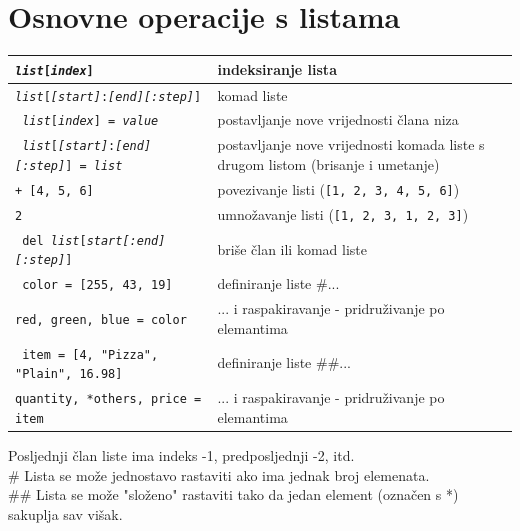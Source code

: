 \documentclass[10pt]{article}
\begin{document}
    \section*{\color{NavyBlue} Osnovne operacije s listama}
    \begin{tabular}{|>{\tt}p{9.00cm}|>{}p{15.50cm}|}
        \hline
        \textit{list}[\textit{index}] & indeksiranje lista 
        \\ \hline
        \textit{list}[\textit{[start]}:\textit{[end]}\textit{[:step]}] & komad liste 
        \\ \hline
        \textit{list}[\textit{index}] = \textit{value} & postavljanje nove vrijednosti člana niza
        \\ \hline
        \textit{list}[\textit{[start]}:\textit{[end]}\textit{[:step]}] = \textit{list} & postavljanje nove vrijednosti komada liste s drugom listom (brisanje i umetanje)
        \\ \hline
        [1, 2, 3] + [4, 5, 6] & povezivanje listi (\texttt{[1, 2, 3, 4, 5, 6]})
        \\ \hline
        [1, 2, 3] * 2 & umnožavanje listi (\texttt{[1, 2, 3, 1, 2, 3]})
        \\ \hline
        del \textit{list}[\textit{start}\textit{[:end]}\textit{[:step]}] & briše član ili komad liste
        \\ \hline
        color = [255, 43, 19] & definiranje liste \#...
        \\
        red, green, blue = color & ... i raspakiravanje - pridruživanje po elemantima
        \\ \hline
        item = [4, "Pizza", "Plain", 16.98] & definiranje liste \#\#...
        \\
        quantity, *others, price = item & ... i raspakiravanje - pridruživanje po elemantima
        \\ \hline
    \end{tabular}
    \begin{center}
        \footnotesize
        Posljednji član liste ima indeks -1, predposljednji -2, itd. \\
        \# Lista se može jednostavo rastaviti ako ima jednak broj elemenata. \\
        \#\# Lista se može "složeno" rastaviti tako da jedan element (označen s *) sakuplja sav višak.
    \end{center}
\end{document}
